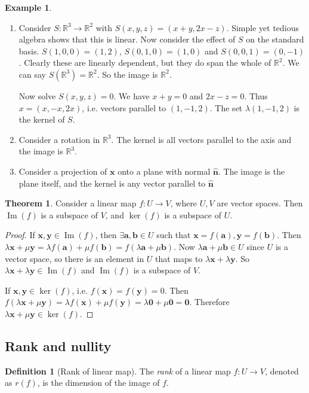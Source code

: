\documentclass[a4paper]{article}
\theoremstyle{definition}
\newtheorem*{thm}{Theorem}
\newtheorem*{defi}{Definition}
\newtheorem*{eg}{Example}
\newcommand{\mb}[1]{\mathbf{#1}}
\newcommand{\R}{\mathbb{R}}
\DeclareMathOperator\im{Im}
\begin{document}
\begin{eg}\leavevmode
  \begin{enumerate}
  \item Consider $S: \R^3 \to \R^2$ with $S(x, y, z) = (x + y, 2x - z)$. Simple yet tedious algebra shows that this is linear.
   Now consider the effect of $S$ on the standard basis. $S(1, 0, 0) = (1, 2)$, $S(0, 1, 0) = (1, 0)$ and $S(0, 0, 1) = (0, -1)$. Clearly these are linearly dependent, but they do span the whole of $\R^2$. We can say $S(\R^3) = \R^2$. So the image is $\R^2$.

   Now solve $S(x, y, z) = 0$. We have $x + y = 0$ and $2x - z = 0$. Thus $x = (x, -x, 2x)$, i.e. vectors parallel to $(1, -1, 2)$. The set $\lambda(1, -1, 2)$ is the kernel of $S$.
   \item Consider a rotation in $\R^3$. The kernel is all vectors parallel to the axis and the image is $\R^3$.
   \item Consider a projection of $\mb{x}$ onto a plane with normal $\mb{\hat n}$. The image is the plane itself, and the kernel is any vector parallel to $\mb{\hat n}$
  \end{enumerate}
\end{eg}

\begin{thm}
  Consider a linear map $f: U\to V$, where $U, V$ are vector spaces. Then $\im (f)$ is a subspace of $V$, and $\ker (f)$ is a subspace of $U$.
\end{thm}

\begin{proof}
  If $\mb{x, y}\in \im (f)$, then $\exists \mb{a, b}\in U$ such that $\mb{x} = f(\mb{a}), \mb{y} = f(\mb{b})$.  Then $\lambda \mb{x} + \mu\mb {y} = \lambda f(\mb{a}) + \mu f(\mb{b}) = f(\lambda\mb{a} + \mu\mb{b})$. Now $\lambda\mb{a} + \mu\mb{b}\in U$ since $U$ is a vector space, so there is an element in $U$ that maps to $\lambda\mb{x}+ \lambda\mb{y}$. So $\lambda\mb{x}+ \lambda\mb{y}\in \im (f)$ and $\im (f)$ is a subspace of $V$.

  If $\mb{x, y}\in \ker(f)$, i.e. $f(\mb{x}) = f(\mb {y}) = 0$. Then $f(\lambda\mb{x} + \mu\mb{y}) = \lambda f(\mb{x}) + \mu f(\mb{y}) = \lambda \mb{0} + \mu\mb{0} = \mb{0}$. Therefore $\lambda\mb{x}+ \mu\mb{y} \in \ker (f)$.
\end{proof}

\subsection{Rank and nullity}
\begin{defi}[Rank of linear map]
  The \emph{rank} of a linear map $f: U\to V$, denoted as $r(f)$, is the dimension of the image of $f$.
\end{defi}
\end{document}
